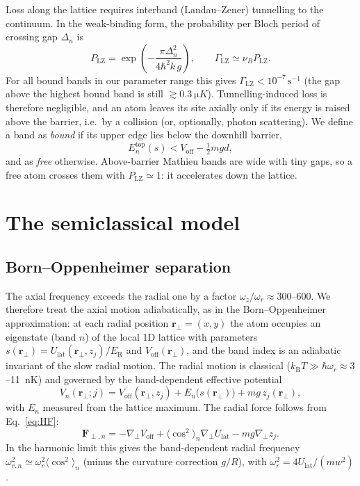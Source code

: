 \documentclass[11pt,a4paper]{article}
\newcommand{\kB}{k_\mathrm{B}}
\newcommand{\ER}{E_\mathrm{R}}
\newcommand{\Ulat}{U_\mathrm{lat}}
\newcommand{\Voff}{V_\mathrm{off}}
\newcommand{\rperp}{\bm{r}_\perp}
\begin{document}
Loss along the lattice requires interband (Landau--Zener) tunnelling to the continuum. In the weak-binding form, the probability per Bloch period of crossing gap $\Delta_n$ is~\cite{Peik1997}
\begin{equation}
P_\mathrm{LZ}=\exp\!\left(-\frac{\pi\Delta_n^2}{4\hbar^2 k\,g}\right),\qquad \Gamma_\mathrm{LZ}\simeq\nu_B P_\mathrm{LZ}.
\end{equation}
For all bound bands in our parameter range this gives $\Gamma_\mathrm{LZ}<10^{-7}\,\mathrm{s^{-1}}$ (the gap above the highest bound band is still $\gtrsim\SI{0.3}{\micro K}$). Tunnelling-induced loss is therefore negligible, and an atom leaves its site axially only if its energy is raised above the barrier, i.e.\ by a collision (or, optionally, photon scattering). We define a band as \emph{bound} if its upper edge lies below the downhill barrier,
\begin{equation}
E_n^\mathrm{top}(s) < \Voff - \tfrac12 mgd ,
\label{eq:boundband}
\end{equation}
and as \emph{free} otherwise. Above-barrier Mathieu bands are wide with tiny gaps, so a free atom crosses them with $P_\mathrm{LZ}\simeq1$: it accelerates down the lattice.

\section{The semiclassical model}
\label{sec:semiclassical}

\subsection{Born--Oppenheimer separation}
The axial frequency exceeds the radial one by a factor $\omega_z/\omega_r\approx300$--$600$. We therefore treat the axial motion adiabatically, as in the Born--Oppenheimer approximation: at each radial position $\rperp=(x,y)$ the atom occupies an eigenstate (band $n$) of the local 1D lattice with parameters $s(\rperp)=\Ulat(\rperp,z_j)/\ER$ and $\Voff(\rperp)$, and the band index is an adiabatic invariant of the slow radial motion. The radial motion is classical ($\kB T\gg\hbar\omega_r\approx3$--\SI{11}{nK}) and governed by the band-dependent effective potential
\begin{equation}
V_n(\rperp;j)=\Voff(\rperp,z_j)+E_n\big(s(\rperp)\big)+mg\,z_j(\rperp),
\label{eq:Vn}
\end{equation}
with $E_n$ measured from the lattice maximum. The radial force follows from Eq.~\eqref{eq:HF}:
\begin{equation}
\bm F_{\perp,n}=-\nabla_\perp\Voff+\langle\cos^2\rangle_n\nabla_\perp\Ulat-mg\nabla_\perp z_j .
\end{equation}
In the harmonic limit this gives the band-dependent radial frequency $\omega_{r,n}^2\simeq\omega_r^2\langle\cos^2\rangle_n$ (minus the curvature correction $g/R$), with $\omega_r^2=4\Ulat/(m w^2)$.
\end{document}
